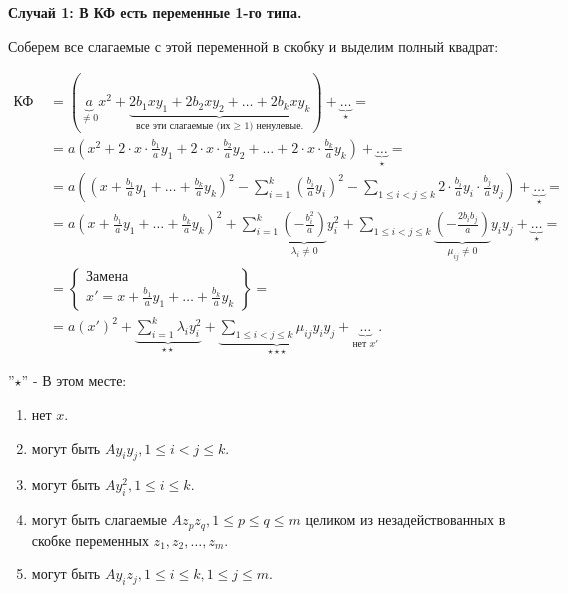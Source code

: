 \textbf{Случай 1: В КФ есть переменные 1-го типа.}

Соберем все слагаемые с этой переменной в скобку и выделим полный квадрат:

\begin{align}
    \text{КФ } &= (\underbrace{a}_{\ne 0}x^2 + \underbrace{2b_1xy_1 + 2b_2xy_2 + \ldots + 2b_kxy_k}_{\text{все эти слагаемые (их }\geq \text{ 1) ненулевые.}}) + \underbrace{\ldots}_{\star} = \\
    &= a(x^2 + 2\cdot x\cdot\frac{b_1}{a}y_1 + 2\cdot x\cdot\frac{b_2}{a}y_2 + \ldots + 2\cdot x\cdot\frac{b_k}{a}y_k) + \underbrace{\ldots}_{\star} = \\
    &= a\left((x + \frac{b_1}{a}y_1 + \ldots + \frac{b_k}{a}y_k)^2 - \sum_{i = 1}^k(\frac{b_i}{a}y_i)^2 - \sum_{1 \leq i < j \leq k}2\cdot\frac{b_i}{a}y_i\cdot \frac{b_j}{a}y_j\right) + \underbrace{\ldots}_{\star} = \\
    &= a(x + \frac{b_1}{a}y_1 + \ldots + \frac{b_k}{a}y_k)^2 + \sum_{i = 1}^k\underbrace{\left(-\frac{b^2_i}{a}\right)}_{\lambda_i \ne 0}y^2_i + \sum_{1 \leq i < j \leq k}\underbrace{\left(-\frac{2b_ib_j}{a}\right)}_{\mu_{ij} \ne 0}y_iy_j + \underbrace{\ldots}_{\star} = \\
    &=\left\{ 
            \begin{array}{l}
                \text{Замена} \\
                x' = x + \frac{b_1}{a}y_1 + \ldots + \frac{b_k}{a}y_k
            \end{array} \right\} = \\
    &= a(x')^2 + \underbrace{\sum_{i = 1}^k\lambda_iy^2_i}_{\star\star} + \underbrace{\sum_{1 \leq i < j \leq k}\mu_{ij}y_iy_j}_{\star\star\star} + \underbrace{\ldots}_{\text{нет }x'}.
\end{align}

\newpage

''$\star$'' - В этом месте:

\begin{enumerate}
    \item нет $x$.
    \item могут быть $Ay_iy_j, 1\leq i < j \leq k$.
    \item могут быть $Ay^2_i, 1 \leq i \leq k$.
    \item могут быть слагаемые $Az_pz_q, 1 \leq p \leq q \leq m$ целиком из незадействованных в скобке переменных $z_1, z_2, \ldots, z_m$.
    \item могут быть $Ay_iz_j, 1\leq i\leq k, 1\leq j\leq m$.
\end{enumerate}


